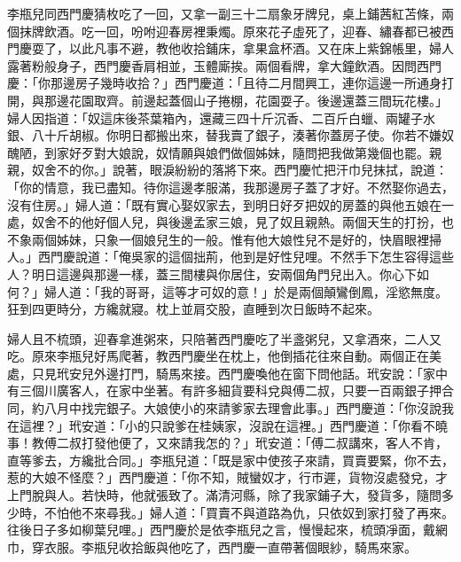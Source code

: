 李瓶兒同西門慶猜枚吃了一回，又拿一副三十二扇象牙牌兒，桌上鋪茜紅苫條，兩個抹牌飲酒。吃一回，吩咐迎春房裡秉燭。原來花子虛死了，迎春、繡春都已被西門慶耍了，以此凡事不避，教他收拾鋪床，拿果盒杯酒。又在床上紫錦帳里，婦人露著粉般身子，西門慶香肩相並，玉體廝挨。兩個看牌，拿大鐘飲酒。因問西門慶：「你那邊房子幾時收拾？」西門慶道：「且待二月間興工，連你這邊一所通身打開，與那邊花園取齊。前邊起蓋個山子捲棚，花園耍子。後邊還蓋三間玩花樓。」婦人因指道：「奴這床後茶葉箱內，還藏三四十斤沉香、二百斤白蠟、兩罐子水銀、八十斤胡椒。你明日都搬出來，替我賣了銀子，湊著你蓋房子使。你若不嫌奴醜陋，到家好歹對大娘說，奴情願與娘們做個姊妹，隨問把我做第幾個也罷。親親，奴舍不的你。」說著，眼淚紛紛的落將下來。西門慶忙把汗巾兒抹拭，說道：「你的情意，我已盡知。待你這邊孝服滿，我那邊房子蓋了才好。不然娶你過去，沒有住房。」婦人道：「既有實心娶奴家去，到明日好歹把奴的房蓋的與他五娘在一處，奴舍不的他好個人兒，與後邊孟家三娘，見了奴且親熱。兩個天生的打扮，也不象兩個姊妹，只象一個娘兒生的一般。惟有他大娘性兒不是好的，快眉眼裡掃人。」西門慶說道：「俺吳家的這個拙荊，他到是好性兒哩。不然手下怎生容得這些人？明日這邊與那邊一樣，蓋三間樓與你居住，安兩個角門兒出入。你心下如何？」婦人道：「我的哥哥，這等才可奴的意！」於是兩個顛鸞倒鳳，淫慾無度。狂到四更時分，方纔就寢。枕上並肩交股，直睡到次日飯時不起來。

婦人且不梳頭，迎春拿進粥來，只陪著西門慶吃了半盞粥兒，又拿酒來，二人又吃。原來李瓶兒好馬爬著，教西門慶坐在枕上，他倒插花往來自動。兩個正在美處，只見玳安兒外邊打門，騎馬來接。西門慶喚他在窗下問他話。玳安說：「家中有三個川廣客人，在家中坐著。有許多細貨要科兌與傅二叔，只要一百兩銀子押合同，約八月中找完銀子。大娘使小的來請爹家去理會此事。」西門慶道：「你沒說我在這裡？」玳安道：「小的只說爹在桂姨家，沒說在這裡。」西門慶道：「你看不曉事！教傅二叔打發他便了，又來請我怎的？」玳安道：「傅二叔講來，客人不肯，直等爹去，方纔批合同。」李瓶兒道：「既是家中使孩子來請，買賣要緊，你不去，惹的大娘不怪麼？」西門慶道：「你不知，賊蠻奴才，行市遲，貨物沒處發兌，才上門脫與人。若快時，他就張致了。滿清河縣，除了我家鋪子大，發貨多，隨問多少時，不怕他不來尋我。」婦人道：「買賣不與道路為仇，只依奴到家打發了再來。往後日子多如柳葉兒哩。」西門慶於是依李瓶兒之言，慢慢起來，梳頭凈面，戴網巾，穿衣服。李瓶兒收拾飯與他吃了，西門慶一直帶著個眼紗，騎馬來家。

